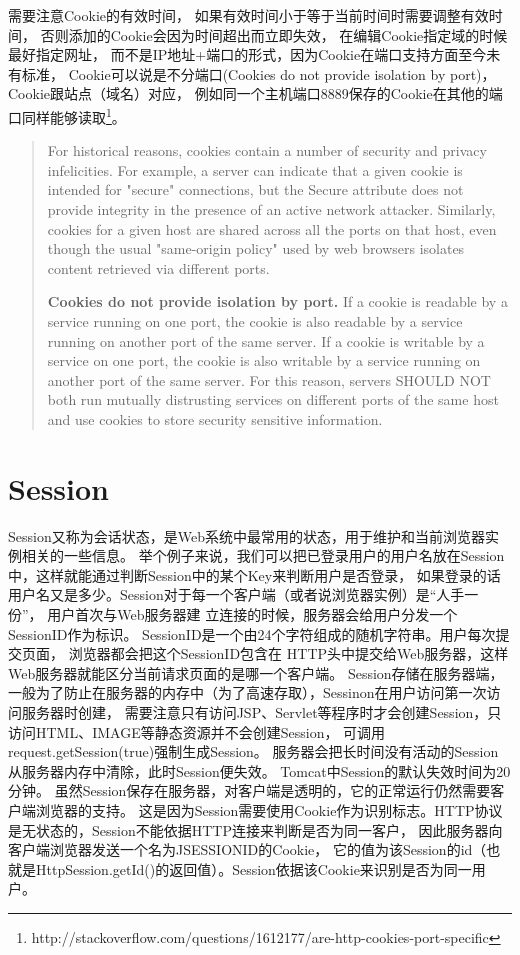 \documentclass{book}
\begin{document}
需要注意Cookie的有效时间，
如果有效时间小于等于当前时间时需要调整有效时间，
否则添加的Cookie会因为时间超出而立即失效，
在编辑Cookie指定域的时候最好指定网址，
而不是IP地址+端口的形式，因为Cookie在端口支持方面至今未有标准，
Cookie可以说是不分端口(Cookies do not provide isolation by port)，
Cookie跟站点（域名）对应，
例如同一个主机端口8889保存的Cookie在其他的端口同样能够读取\footnote{http://stackoverflow.com/questions/1612177/are-http-cookies-port-specific}。

\begin{quotation}
For historical reasons, cookies contain a number of security and privacy infelicities. 
For example, a server can indicate that a given cookie is intended for "secure" connections, 
but the Secure attribute does not provide integrity in the presence of an active network attacker. Similarly, cookies for a given host are shared across all the ports on that host, 
even though the usual "same-origin policy" used by web browsers isolates content retrieved via different ports.

\textbf{Cookies do not provide isolation by port.} If a cookie is readable by a service running 
on one port, the cookie is also readable by a service running on another port of the same server. If a cookie is writable by a service on one port, the cookie is also writable by a service 
running on another port of the same server. For this reason, 
servers SHOULD NOT both run mutually distrusting services on different ports of 
the same host and use cookies to store security sensitive information.
\end{quotation}


\section{Session}

Session又称为会话状态，是Web系统中最常用的状态，用于维护和当前浏览器实例相关的一些信息。
举个例子来说，我们可以把已登录用户的用户名放在Session中，这样就能通过判断Session中的某个Key来判断用户是否登录，
如果登录的话用户名又是多少。Session对于每一个客户端（或者说浏览器实例）是“人手一份”，
用户首次与Web服务器建 立连接的时候，服务器会给用户分发一个 SessionID作为标识。
SessionID是一个由24个字符组成的随机字符串。用户每次提交页面，
浏览器都会把这个SessionID包含在 HTTP头中提交给Web服务器，这样Web服务器就能区分当前请求页面的是哪一个客户端。
Session存储在服务器端，一般为了防止在服务器的内存中（为了高速存取），Sessinon在用户访问第一次访问服务器时创建，
需要注意只有访问JSP、Servlet等程序时才会创建Session，只访问HTML、IMAGE等静态资源并不会创建Session，
可调用request.getSession(true)强制生成Session。
服务器会把长时间没有活动的Session从服务器内存中清除，此时Session便失效。
Tomcat中Session的默认失效时间为20分钟。
虽然Session保存在服务器，对客户端是透明的，它的正常运行仍然需要客户端浏览器的支持。
这是因为Session需要使用Cookie作为识别标志。HTTP协议是无状态的，Session不能依据HTTP连接来判断是否为同一客户，
因此服务器向客户端浏览器发送一个名为JSESSIONID的Cookie，
它的值为该Session的id（也就是HttpSession.getId()的返回值）。Session依据该Cookie来识别是否为同一用户。
\end{document}
